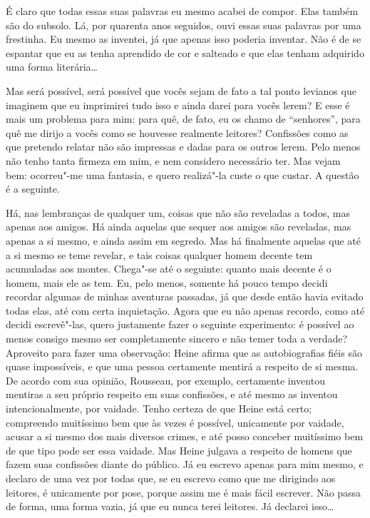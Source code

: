 É claro que todas essas suas palavras eu mesmo acabei de compor. Elas
também são do subsolo. Lá, por quarenta anos seguidos, ouvi essas suas
palavras por uma frestinha. Eu mesmo as inventei, já que apenas isso
poderia inventar. Não é de se espantar que eu as tenha aprendido de cor e salteado 
e que elas tenham adquirido uma forma literária\ldots{}

Mas será possível, será possível que vocês sejam de fato a tal ponto
levianos que imaginem que eu imprimirei tudo isso e ainda darei para
vocês lerem? E esse é mais um problema para mim: para quê, de fato, eu
os chamo de “senhores”, para quê me dirijo a vocês como se houvesse
realmente leitores? Confissões como as que pretendo relatar não são
impressas e dadas para os outros lerem. Pelo menos não tenho tanta
firmeza em mim, e nem considero necessário ter. Mas vejam bem:
ocorreu"-me uma fantasia, e quero realizá"-la custe o que custar. A
questão é a seguinte.

Há, nas lembranças de qualquer um, coisas que não são reveladas a todos,
mas apenas aos amigos. Há ainda aquelas que sequer aos amigos são
reveladas, mas apenas a si mesmo, e ainda assim em segredo. Mas há
finalmente aquelas que até a si mesmo se teme revelar, e tais coisas
qualquer homem decente tem acumuladas aos montes. Chega"-se até o
seguinte: quanto mais decente é o homem, mais ele as tem. Eu, pelo menos,
somente há pouco tempo decidi recordar algumas de minhas aventuras
passadas, já que desde então havia evitado todas elas, até com certa
inquietação. Agora que eu não apenas recordo, como até decidi
escrevê"-las, quero justamente fazer o seguinte experimento: é possível
ao menos consigo mesmo ser completamente sincero e não temer toda a
verdade? Aproveito para fazer uma observação: Heine afirma que as
autobiografias fiéis são quase impossíveis, e que uma pessoa certamente
mentirá a respeito de si mesma. De acordo com sua opinião, Rousseau,
por exemplo, certamente inventou mentiras a seu próprio respeito em
suas confissões, e até mesmo as inventou intencionalmente, por
vaidade. Tenho certeza de que Heine está certo; compreendo muitíssimo
bem que às vezes é possível, unicamente por vaidade, acusar a si mesmo
dos mais diversos crimes, e até posso conceber muitíssimo bem de que
tipo pode ser essa vaidade. Mas Heine julgava a respeito de homens que
fazem suas confissões diante do público. Já eu escrevo apenas para mim
mesmo, e declaro de uma vez por todas que, se eu escrevo como que me
dirigindo aos leitores, é unicamente por pose, porque assim me é mais
fácil escrever. Não passa de forma, uma forma vazia, já que eu nunca
terei leitores. Já declarei isso\ldots{}

